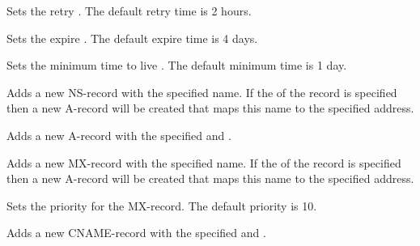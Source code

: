 
Sets the retry . The default retry time is 2 hours.


Sets the expire . The default expire time is 4 days.


Sets the minimum time to live . The default minimum time is 1 day.


Adds a new NS-record with the specified name. If the 
of the record is specified then a new A-record will be created that maps this 
name to the specified address.


Adds a new A-record with the specified  and .


Adds a new MX-record with the specified name. If the 
of the record is specified then a new A-record will be created that maps this 
name to the specified address.


Sets the priority for the MX-record. The default priority is 10.


Adds a new CNAME-record with the specified  and .
